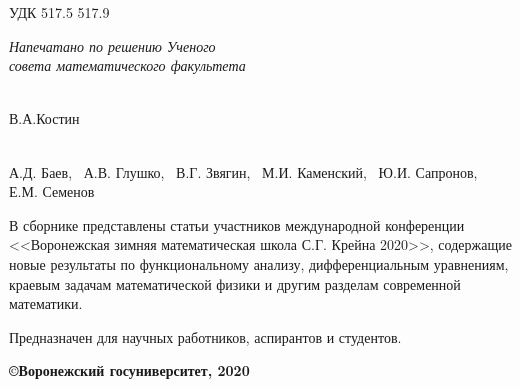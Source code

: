 \noindent УДК 517.5 517.9

\begin{flushright}
{\it Напечатано по решению Ученого \\ совета математического
факультета \\
}
 \end{flushright}
\vspace{15mm}{\bf Материалы работы международной конференции
\\<<Воронежская зимняя математическая школа С.Г.
Крейна - 2020>>. Воронеж: ВГУ, 2020 -  с.}

\vspace{5mm}

 \\
В.А.Костин

\vspace{5mm}

 \\
А.Д. Баев, \  А.В. Глушко, \ В.Г. Звягин, \ М.И. Каменский, \ Ю.И. Сапронов, \\
Е.М. Семенов

\vspace{15mm}

В сборнике представлены статьи участников международной конференции
\\
<<Воронежская зимняя математическая школа С.Г. Крейна 2020>>,
содержащие новые
результаты по функциональному анализу, дифференциальным уравнениям,
краевым задачам математической физики и другим разделам современной
математики.

Предназначен для научных работников, аспирантов и студентов.


\begin{flushright}
{\bf \copyright Воронежский госуниверситет, 2020}
\end{flushright}

\newpage
